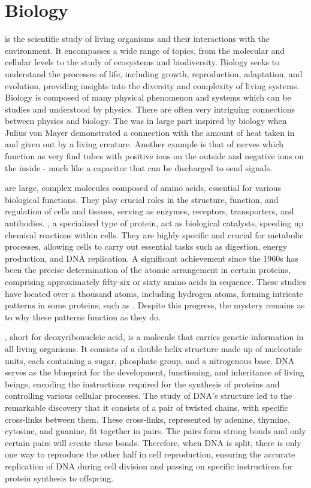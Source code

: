 \section{Biology}

 is the scientific study of living organisms and their interactions with the environment. It encompasses a wide range of topics, from the molecular and cellular levels to the study of ecosystems and biodiversity. Biology seeks to understand the processes of life, including growth, reproduction, adaptation, and evolution, providing insights into the diversity and complexity of living systems. Biology is composed of many physical phenomenon and systems which can be studies and understood by physics. There are often very intriguing connections between physics and biology. The  was in large part inspired by biology when Julius von Mayer demonstrated a connection with the amount of heat taken in and given out by a living creature. Another example is that of nerves which function as very find tubes with positive ions on the outside and negative ions on the inside - much like a capacitor that can be discharged to send signals.

 are large, complex molecules composed of amino acids, essential for various biological functions. They play crucial roles in the structure, function, and regulation of cells and tissues, serving as enzymes, receptors, transporters, and antibodies. , a specialized type of protein, act as biological catalysts, speeding up chemical reactions within cells. They are highly specific and crucial for metabolic processes, allowing cells to carry out essential tasks such as digestion, energy production, and DNA replication. A significant achievement since the 1960s has been the precise determination of the atomic arrangement in certain proteins, comprising approximately fifty-six or sixty amino acids in sequence. These studies have located over a thousand atoms, including hydrogen atoms, forming intricate patterns in some proteins, such as . Despite this progress, the mystery remains as to why these patterns function as they do.

, short for deoxyribonucleic acid, is a molecule that carries genetic information in all living organisms. It consists of a double helix structure made up of nucleotide units, each containing a sugar, phosphate group, and a nitrogenous base. DNA serves as the blueprint for the development, functioning, and inheritance of living beings, encoding the instructions required for the synthesis of proteins and controlling various cellular processes. The study of DNA's structure led to the remarkable discovery that it consists of a pair of twisted chains, with specific cross-links between them. These cross-links, represented by adenine, thymine, cytosine, and guanine, fit together in pairs. The pairs form strong bonds and only certain pairs will create these bonds. Therefore, when DNA is split, there is only one way to reproduce the other half in cell reproduction, ensuring the accurate replication of DNA during cell division and passing on specific instructions for protein synthesis to offspring.

